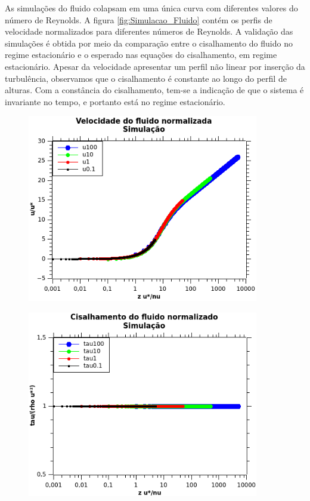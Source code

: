     As simulações do fluido colapsam em uma única curva com diferentes valores do número de Reynolds. A figura \ref{fig:Simulacao_Fluido} contém os perfis de velocidade normalizados para diferentes números de Reynolds. A validação das simulações é obtida por meio da comparação entre o cisalhamento do fluido no regime estacionário e o esperado nas equações do cisalhamento, em regime estacionário. Apesar da velocidade apresentar um perfil não linear por inserção da turbulência, observamos que o cisalhamento é constante ao longo do perfil de alturas. Com a constância do cisalhamento, tem-se a indicação de que o sistema é invariante no tempo, e portanto está no regime estacionário.

\begin{figure}
    \centering
    \begin{minipage}{.45\linewidth}
        \includegraphics[width = 0.9\textwidth]{04-figuras/Velocidade_Fluido_Simulacao.png}
        \label{fig:Velocidade_Fluido}
    \end{minipage}
    \begin{minipage}{.45\linewidth}
        \includegraphics[width = 0.9\textwidth]{04-figuras/Cisalhamento_Fluido_Simulacao.png}

\end{minipage}
\end{figure}
